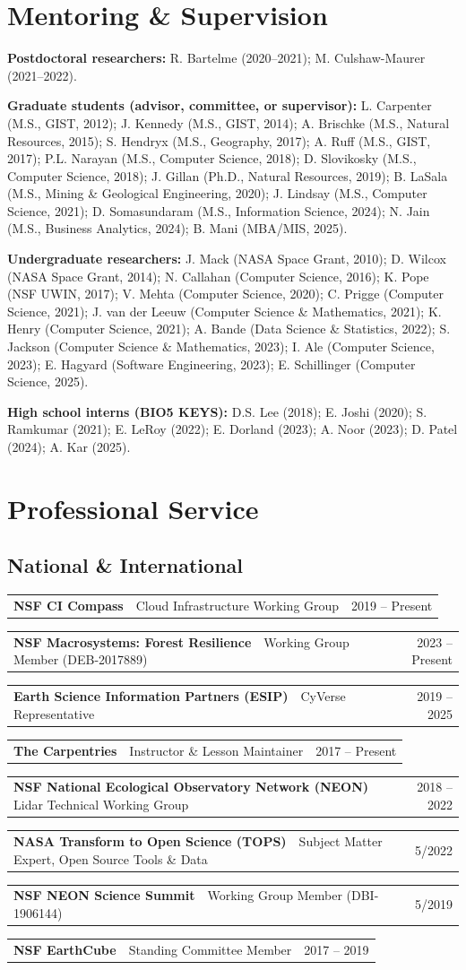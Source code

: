 \documentclass[11pt,letterpaper]{article}
\makeatletter
\newcommand{\dated}[2]{%
  \begin{tabularx}{\linewidth}{@{}X r@{}}
    #1 & {\small #2}
  \end{tabularx}\par\vspace{2pt}}
\makeatother
\begin{document}
\section{Mentoring \& Supervision}
\textbf{Postdoctoral researchers:} R. Bartelme (2020--2021); M. Culshaw-Maurer (2021--2022).

\smallskip
\textbf{Graduate students (advisor, committee, or supervisor):}
L. Carpenter (M.S., GIST, 2012);
J. Kennedy (M.S., GIST, 2014);
A. Brischke (M.S., Natural Resources, 2015);
S. Hendryx (M.S., Geography, 2017);
A. Ruff (M.S., GIST, 2017);
P.L. Narayan (M.S., Computer Science, 2018);
D. Slovikosky (M.S., Computer Science, 2018);
J. Gillan (Ph.D., Natural Resources, 2019);
B. LaSala (M.S., Mining \& Geological Engineering, 2020);
J. Lindsay (M.S., Computer Science, 2021);
D. Somasundaram (M.S., Information Science, 2024);
N. Jain (M.S., Business Analytics, 2024);
B. Mani (MBA/MIS, 2025).

\smallskip
\textbf{Undergraduate researchers:}
J. Mack (NASA Space Grant, 2010);
D. Wilcox (NASA Space Grant, 2014);
N. Callahan (Computer Science, 2016);
K. Pope (NSF UWIN, 2017);
V. Mehta (Computer Science, 2020);
C. Prigge (Computer Science, 2021);
J. van der Leeuw (Computer Science \& Mathematics, 2021);
K. Henry (Computer Science, 2021);
A. Bande (Data Science \& Statistics, 2022);
S. Jackson (Computer Science \& Mathematics, 2023);
I. Ale (Computer Science, 2023);
E. Hagyard (Software Engineering, 2023);
E. Schillinger (Computer Science, 2025).

\smallskip
\textbf{High school interns (BIO5 KEYS):}
D.S. Lee (2018); E. Joshi (2020); S. Ramkumar (2021); E. LeRoy (2022); E. Dorland (2023); A. Noor (2023); D. Patel (2024); A. Kar (2025).

\section{Professional Service}

\subsection{National \& International}
\dated{\textbf{NSF CI Compass} \,\textendash\, Cloud Infrastructure Working Group}{2019 -- Present}
\dated{\textbf{NSF Macrosystems: Forest Resilience} \,\textendash\, Working Group Member (DEB-2017889)}{2023 -- Present}
\dated{\textbf{Earth Science Information Partners (ESIP)} \,\textendash\, CyVerse Representative}{2019 -- 2025}
\dated{\textbf{The Carpentries} \,\textendash\, Instructor \& Lesson Maintainer}{2017 -- Present}
\dated{\textbf{NSF National Ecological Observatory Network (NEON)} \,\textendash\, Lidar Technical Working Group}{2018 -- 2022}
\dated{\textbf{NASA Transform to Open Science (TOPS)} \,\textendash\, Subject Matter Expert, Open Source Tools \& Data}{5/2022}
\dated{\textbf{NSF NEON Science Summit} \,\textendash\, Working Group Member (DBI-1906144)}{5/2019}
\dated{\textbf{NSF EarthCube} \,\textendash\, Standing Committee Member}{2017 -- 2019}
\end{document}
